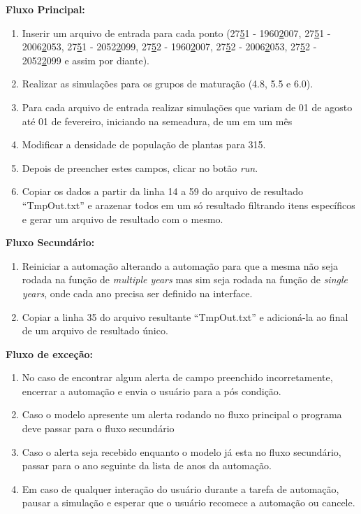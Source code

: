 \documentclass[tg]{mdtufsm}
\begin{document}
	{\bf Fluxo Principal:}

	\begin{enumerate}
		\item Inserir um arquivo de entrada para cada ponto (27\underline51 - 1960\underline2007, 27\underline51 - 2006\underline2053, 27\underline51 - 2052\underline2099, 27\underline52 - 1960\underline2007, 27\underline52 - 2006\underline2053, 27\underline52 - 2052\underline2099 e assim por diante).
		\item Realizar as simulações para os grupos de maturação (4.8, 5.5 e 6.0).
		\item Para cada arquivo de entrada realizar simulações que variam de 01 de agosto até 01 de fevereiro, iniciando na semeadura, de um em um mês
		\item Modificar a densidade de população de plantas para 315.
		\item Depois de preencher estes campos, clicar no botão \emph{run}.
		\item Copiar os dados a partir da linha 14 a 59 do arquivo de resultado “TmpOut.txt” e arazenar todos em um só resultado filtrando itens específicos e gerar um arquivo de resultado com o mesmo.
	\end{enumerate}

	{\bf Fluxo Secundário:}

	\begin{enumerate}
		\item Reiniciar a automação alterando a automação para que a mesma não seja rodada na função de \emph{multiple years} mas sim seja rodada na função de \emph{single years}, onde cada ano precisa ser definido na interface.
		\item Copiar a linha 35 do arquivo resultante “TmpOut.txt” e adicioná-la ao final de um arquivo de resultado único.
	\end{enumerate}

	{\bf Fluxo de exceção:}

	\begin{enumerate}
		\item No caso de encontrar algum alerta de campo preenchido incorretamente, encerrar a automação e envia o usuário para a pós condição.
		\item Caso o modelo apresente um alerta rodando no fluxo principal o programa deve passar para o fluxo secundário
		\item Caso o alerta seja recebido enquanto o modelo já esta no fluxo secundário, passar para o ano seguinte da lista de anos da automação.
		\item Em caso de qualquer interação do usuário durante a tarefa de automação, pausar a simulação e esperar que o usuário recomece a automação ou cancele.
	\end{enumerate}
\end{document}
